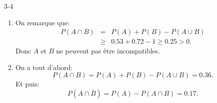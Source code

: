 \begin{corrige}{3-4}

\begin{enumerate}
 \item On remarque que:
 \begin{eqnarray*}
  P ( A \cap B )& = & P(A) + P(B) - P(A\cup B)\\
  & \geq & 0.53 + 0.72 - 1 \geq 0.25 > 0.
 \end{eqnarray*}
 Donc $A$ et $B$ ne peuvent pas être incompatibles.
 
 \item On a tout d'abord:
 \[
  P ( A \cap B ) = P(A) + P(B) - P(A\cup B) = 0.36.
 \]
 Et puis:
 \[
  P ( A \cap \bar{B} ) = P ( A ) - P ( A \cap B) = 0.17.
 \]

\end{enumerate}


\end{corrige}
